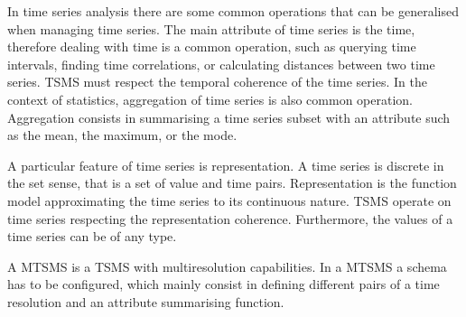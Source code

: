 In time series analysis there are some common operations that can be
generalised when managing time series.
%
The main attribute of time series is the time, therefore dealing with
time is a common operation, such as querying time intervals, finding
time correlations, or calculating distances between two time
series. TSMS must respect the temporal coherence of the time series.
In the context of statistics, aggregation of time series is also
common operation. Aggregation consists in summarising a time series
subset with an attribute such as the mean, the maximum, or the mode.

A particular feature of time series is representation. A time series
is discrete in the set sense, that is a set of value and time
pairs. Representation is the function model approximating the time
series to its continuous nature. TSMS operate on time series
respecting the representation coherence. Furthermore, the values of a
time series can be of any type.






A MTSMS is a TSMS with multiresolution capabilities.
In a MTSMS a schema has to be configured, which mainly consist in
defining different pairs of a time resolution and an attribute summarising
function. 



%   


%   


